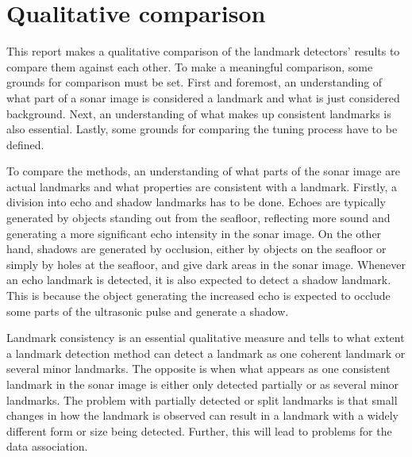 \section{Qualitative comparison}

This report makes a qualitative comparison of the landmark detectors' results to compare them against each other. To make a meaningful comparison, some grounds for comparison must be set. First and foremost, an understanding of what part of a sonar image is considered a landmark and what is just considered background. Next, an understanding of what makes up consistent landmarks is also essential. Lastly, some grounds for comparing the tuning process have to be defined. 

To compare the methods, an understanding of what parts of the sonar image are actual landmarks and what properties are consistent with a landmark. Firstly, a division into echo and shadow landmarks has to be done. Echoes are typically generated by objects standing out from the seafloor, reflecting more sound and generating a more significant echo intensity in the sonar image. On the other hand, shadows are generated by occlusion, either by objects on the seafloor or simply by holes at the seafloor, and give dark areas in the sonar image. Whenever an echo landmark is detected, it is also expected to detect a shadow landmark. This is because the object generating the increased echo is expected to occlude some parts of the ultrasonic pulse and generate a shadow. 

Landmark consistency is an essential qualitative measure and tells to what extent a landmark detection method can detect a landmark as one coherent landmark or several minor landmarks. The opposite is when what appears as one consistent landmark in the sonar image is either only detected partially or as several minor landmarks. The problem with partially detected or split landmarks is that small changes in how the landmark is observed can result in a landmark with a widely different form or size being detected. Further, this will lead to problems for the data association. 

